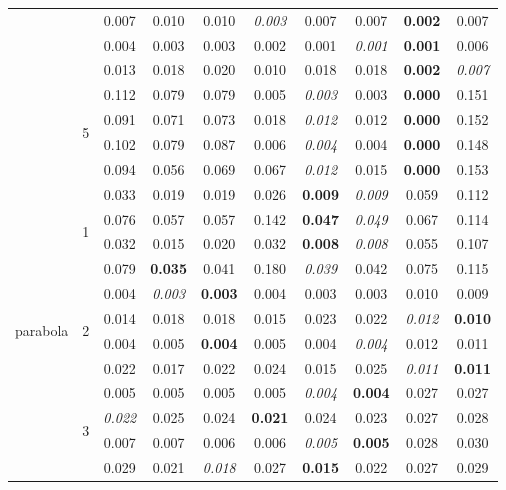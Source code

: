 \documentclass[authoryear, review, 11pt]{elsarticle}
\begin{document}
\begin{table}
\begin{center}
{\begin{tabular}{cccccccccc}
   &  & 0.007 & 0.010 & 0.010 & \emph{0.003} & 0.007 & 0.007 & \textbf{0.002} & 0.007 \\ 
   &  & 0.004 & 0.003 & 0.003 & 0.002 & 0.001 & \emph{0.001} & \textbf{0.001} & 0.006 \\ 
   &  & 0.013 & 0.018 & 0.020 & 0.010 & 0.018 & 0.018 & \textbf{0.002} & \emph{0.007} \\ 
  \cline{3-10}
   & \multirow{4}{*}{5} & 0.112 & 0.079 & 0.079 & 0.005 & \emph{0.003} & 0.003 & \textbf{0.000} & 0.151 \\ 
   &  & 0.091 & 0.071 & 0.073 & 0.018 & \emph{0.012} & 0.012 & \textbf{0.000} & 0.152 \\ 
   &  & 0.102 & 0.079 & 0.087 & 0.006 & \emph{0.004} & 0.004 & \textbf{0.000} & 0.148 \\ 
   &  & 0.094 & 0.056 & 0.069 & 0.067 & \emph{0.012} & 0.015 & \textbf{0.000} & 0.153 \\ 
  \hline
  \multirow{20}{*}{parabola} & \multirow{4}{*}{1} & 0.033 & 0.019 & 0.019 & 0.026 & \textbf{0.009} & \emph{0.009} & 0.059 & 0.112 \\ 
   &  & 0.076 & 0.057 & 0.057 & 0.142 & \textbf{0.047} & \emph{0.049} & 0.067 & 0.114 \\ 
   &  & 0.032 & 0.015 & 0.020 & 0.032 & \textbf{0.008} & \emph{0.008} & 0.055 & 0.107 \\ 
   &  & 0.079 & \textbf{0.035} & 0.041 & 0.180 & \emph{0.039} & 0.042 & 0.075 & 0.115 \\ 
  \cline{3-10}
   & \multirow{4}{*}{2} & 0.004 & \emph{0.003} & \textbf{0.003} & 0.004 & 0.003 & 0.003 & 0.010 & 0.009 \\ 
   &  & 0.014 & 0.018 & 0.018 & 0.015 & 0.023 & 0.022 & \emph{0.012} & \textbf{0.010} \\ 
   &  & 0.004 & 0.005 & \textbf{0.004} & 0.005 & 0.004 & \emph{0.004} & 0.012 & 0.011 \\ 
   &  & 0.022 & 0.017 & 0.022 & 0.024 & 0.015 & 0.025 & \emph{0.011} & \textbf{0.011} \\ 
  \cline{3-10}
   & \multirow{4}{*}{3} & 0.005 & 0.005 & 0.005 & 0.005 & \emph{0.004} & \textbf{0.004} & 0.027 & 0.027 \\ 
   &  & \emph{0.022} & 0.025 & 0.024 & \textbf{0.021} & 0.024 & 0.023 & 0.027 & 0.028 \\ 
   &  & 0.007 & 0.007 & 0.006 & 0.006 & \emph{0.005} & \textbf{0.005} & 0.028 & 0.030 \\ 
   &  & 0.029 & 0.021 & \emph{0.018} & 0.027 & \textbf{0.015} & 0.022 & 0.027 & 0.029 \\ 

\end{tabular}}
\end{center}
\end{table}
\end{document}
